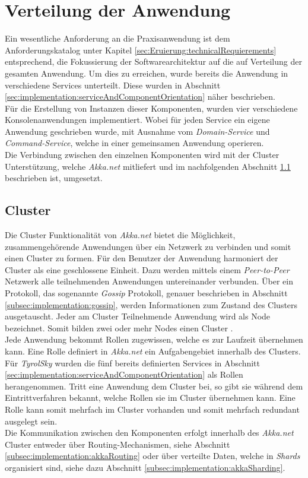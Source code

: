 \section{Verteilung der Anwendung}
\label{subsec:implementation:ApplicationDistribution}
Ein wesentliche Anforderung an die Praxisanwendung ist dem Anforderungskatalog unter Kapitel \ref{sec:Eruierung:technicalRequierements} entsprechend, die Fokussierung der Softwarearchitektur auf die auf Verteilung der gesamten Anwendung. Um dies zu erreichen, wurde bereits die Anwendung in verschiedene Services unterteilt. Diese wurden in Abschnitt \ref{sec:implementation:serviceAndComponentOrientation} näher beschrieben. \\
Für die Erstellung von Instanzen dieser Komponenten, wurden vier verschiedene Konsolenanwendungen implementiert. Wobei für jeden Service ein eigene Anwendung geschrieben wurde, mit Ausnahme vom \textit{Domain-Service} und \textit{Command-Service}, welche in einer gemeinsamen Anwendung operieren. \\
Die Verbindung zwischen den einzelnen Komponenten wird mit der Cluster Unterstützung, welche \textit{Akka.net} mitliefert und im nachfolgenden Abschnitt \ref{subsec:implementation:akka:cluster} beschrieben ist, umgesetzt. 

\subsection{Cluster}
\label{subsec:implementation:akka:cluster}
Die Cluster Funktionalität von \textit{Akka.net} bietet die Möglichkeit, zusammengehörende Anwendungen über ein Netzwerk zu verbinden und somit einen Cluster zu formen. Für den Benutzer der Anwendung harmoniert der Cluster als eine geschlossene Einheit. Dazu werden mittels einem \textit{Peer-to-Peer} Netzwerk alle teilnehmenden Anwendungen untereinander verbunden. Über ein Protokoll, das sogenannte \textit{Gossip} Protokoll, genauer beschrieben in Abschnitt \ref{subsec:implementation:gossip}, werden Informationen zum Zustand des Clusters ausgetauscht. Jeder am Cluster Teilnehmende Anwendung wird als Node bezeichnet. Somit bilden zwei oder mehr Nodes einen Cluster \citep{akkaInAction}. \\
Jede Anwendung bekommt Rollen zugewissen, welche es zur Laufzeit übernehmen kann. Eine Rolle definiert in \textit{Akka.net} ein Aufgabengebiet innerhalb des Clusters. Für \textit{TyrolSky} wurden die fünf bereits definierten Services in Abschnitt \ref{sec:implementation:serviceAndComponentOrientation} als Rollen herangenommen. Tritt eine Anwendung dem Cluster bei, so gibt sie während dem Eintrittverfahren bekannt, welche Rollen sie im Cluster übernehmen kann. Eine Rolle kann somit mehrfach im Cluster vorhanden und somit mehrfach redundant ausgelegt sein. \\
Die Kommunikation zwischen den Komponenten erfolgt innerhalb des \textit{Akka.net} Cluster entweder über Routing-Mechanismen, siehe Abschnitt \ref{subsec:implementation:akkaRouting} oder über verteilte Daten, welche in \textit{Shards} organisiert sind, siehe dazu Abschnitt \ref{subsec:implementation:akkaSharding}. 

